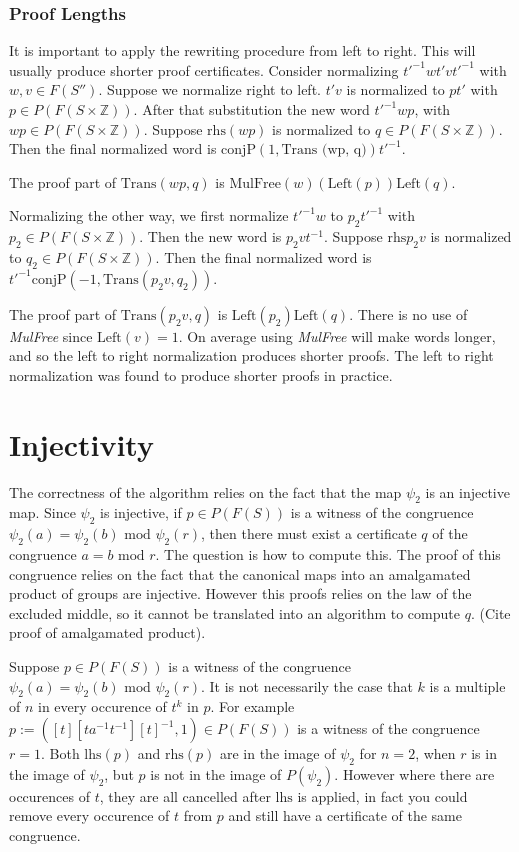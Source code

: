 \documentclass[11pt]{article} %
\theoremstyle{definition}
\theoremstyle{definition}
\theoremstyle{definition}
\theoremstyle{definition}
\theoremstyle{definition}
\theoremstyle{definition}
\begin{document}
\subsubsection{Proof Lengths}

It is important to apply the rewriting procedure from left to right. This will usually
produce shorter proof certificates. Consider normalizing $t'^{-1}wt'vt'^{-1}$ with $w, v \in F(S'')$.
Suppose we normalize right to left.
$t'v$ is normalized to $pt'$ with $p \in P(F(S \times \mathbb{Z}))$.
After that substitution the new word $t'^{-1}wp$, with $wp \in P(F(S \times \mathbb{Z}))$.
Suppose $\text{rhs}(wp)$ is normalized to $q \in P(F(S \times \mathbb{Z}))$.
Then the final normalized word is $\text{conjP}(1, \text{Trans (wp, q)})t'^{-1}$.

The proof part of $\text{Trans}(wp, q)$ is $\text{MulFree}(w)(\text{Left}(p))\text{Left}(q)$.

Normalizing the other way, we first normalize $t'^{-1}w$ to $p_2 t'^{-1}$ with
$p_2 \in P(F(S \times \mathbb{Z}))$. Then the new word is $p_2vt^{-1}$. Suppose
$\text{rhs} p_2 v$ is normalized to $q_2 \in P(F(S \times \mathbb{Z}))$.
Then the final normalized word is $t'^{-1}\text{conjP}(-1, \text{Trans} (p_2v, q_2))$.

The proof part of $\text{Trans} (p_2v, q)$ is $\text{Left}(p_2)\text{Left}(q)$. There is no
use of \textit{MulFree} since $\text{Left}(v)=1$. On average using \textit{MulFree}
will make words longer, and so the left to right normalization produces shorter proofs.
The left to right normalization was found to produce shorter proofs in practice.

\section{Injectivity}

The correctness of the algorithm relies on the fact that the map $\psi_2$ is an injective map.
Since $\psi_2$ is injective, if $p \in P(F(S))$ is a witness of the congruence
$\psi_2(a) = \psi_2(b) \text{ mod } \psi_2(r)$, then there must exist a certificate
$q$ of the congruence $a = b \text{ mod }r$. The question is how to compute this. The proof
of this congruence relies on the fact that the canonical maps into an amalgamated product
of groups are injective. However this proofs relies on the law of the excluded middle, so
it cannot be translated into an algorithm to compute $q$. (Cite proof of amalgamated product).

Suppose $p \in P(F(S))$ is a witness of the congruence
$\psi_2(a) = \psi_2(b) \text{ mod } \psi_2(r)$. It is not necessarily the case that $k$
is a multiple of $n$ in every occurence of $t^k$ in $p$. For example
$p := ([t][ta^{-1}t^{-1}][t]^{-1}, 1) \in P(F(S))$ is a witness of the congruence
$r = 1$. Both $\text{lhs}(p)$ and $\text{rhs}(p)$ are in the image of
$\psi_2$ for $n = 2$, when $r$ is in the image of $\psi_2$,
but $p$ is not in the image of $P(\psi_2)$. However where there are
occurences of $t$, they are all cancelled after $\text{lhs}$ is applied, in fact
you could remove every occurence of $t$ from $p$ and still have a certificate of the same
congruence.
\end{document}
